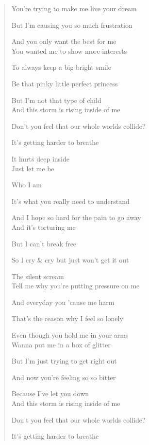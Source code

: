 \documentclass{article}
\begin{document}
\begin{enumerate}
\begin{quotation}
		You're trying to make me live your dream

		But I'm causing you so much frustration

		And you only want the best for me
		\\

		You wanted me to show more interests

		To always keep a big bright smile

		Be that pinky little perfect princess

		But I'm not that type of child
		\\

		And this storm is rising inside of me

		Don't you feel that our whole worlds collide?

		It's getting harder to breathe

		It hurts deep inside
		\\

		Just let me be

		Who I am

		It's what you really need to understand

		And I hope so hard for the pain to go away
		\\

		And it's torturing me

		But I can't break free

		So I cry \& cry but just won't get it out

		The silent scream
		\\

		Tell me why you're putting pressure on me

		And everyday you 'cause me harm

		That's the reason why I feel so lonely

		Even though you hold me in your arms
		\\

		Wanna put me in a box of glitter

		But I'm just trying to get right out

		And now you're feeling so so bitter

		Because I've let you down
		\\

		And this storm is rising inside of me

		Don't you feel that our whole worlds collide?

		It's getting harder to breathe


\end{quotation}
\end{enumerate}
\end{document}

